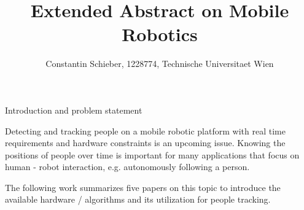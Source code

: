 \documentclass[a4paper,oneside,10pt,DIV12,headsepline,footexclude,headexclude]{scrartcl}
\newif\ifpdf
\let\ifpdf\relax
\begin{document}
\ifpdf
\else
\fi


\pagestyle{plain} %

\title{\Large Extended Abstract on Mobile Robotics}

\author{\large Constantin Schieber, 1228774, Technische Universitaet Wien}

\maketitle

\begin{section}{Introduction and problem statement}

Detecting and tracking people on a mobile robotic platform with real time
requirements and hardware constraints is an upcoming issue.
Knowing the positions of people over time is important for many applications that
focus on human - robot interaction, e.g. autonomously following a person.

The following work summarizes five papers on this topic to introduce the 
available hardware / algorithms and its utilization for people tracking.

\end{section}
\end{document}
